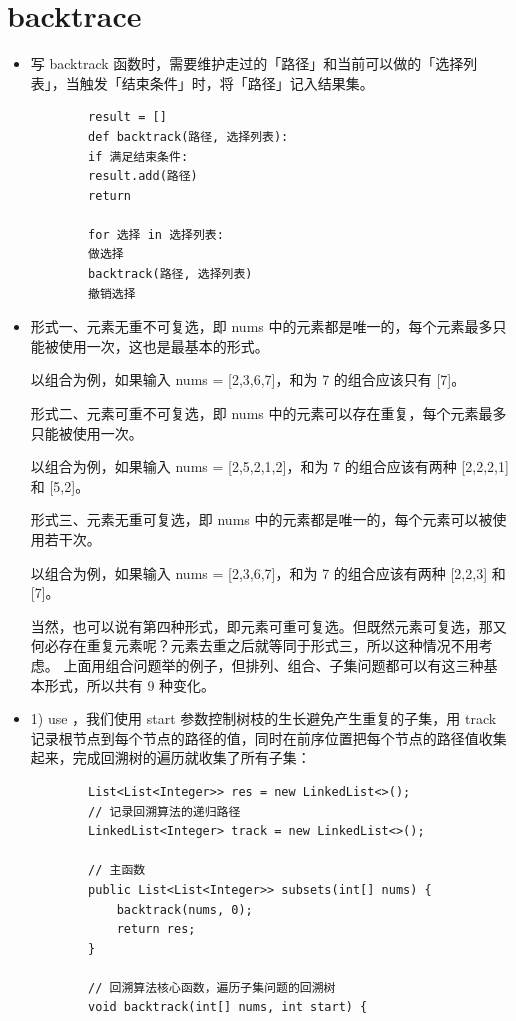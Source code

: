 \documentclass[a4paper,11pt,twoside]{book}
\begin{document}
\section{backtrace}
\begin{itemize}
	
		\item 写 backtrack 函数时，需要维护走过的「路径」和当前可以做的「选择列表」，当触发「结束条件」时，将「路径」记入结果集。
	
	
	\begin{lstlisting}
		result = []
		def backtrack(路径, 选择列表):
		if 满足结束条件:
		result.add(路径)
		return
		
		for 选择 in 选择列表:
		做选择
		backtrack(路径, 选择列表)
		撤销选择
	\end{lstlisting}
	
	
	\item 形式一、元素无重不可复选，即 nums 中的元素都是唯一的，每个元素最多只能被使用一次，这也是最基本的形式。
	
	以组合为例，如果输入 nums = [2,3,6,7]，和为 7 的组合应该只有 [7]。
	
	形式二、元素可重不可复选，即 nums 中的元素可以存在重复，每个元素最多只能被使用一次。
	
	以组合为例，如果输入 nums = [2,5,2,1,2]，和为 7 的组合应该有两种 [2,2,2,1] 和 [5,2]。
	
	形式三、元素无重可复选，即 nums 中的元素都是唯一的，每个元素可以被使用若干次。
	
	以组合为例，如果输入 nums = [2,3,6,7]，和为 7 的组合应该有两种 [2,2,3] 和 [7]。
	
	当然，也可以说有第四种形式，即元素可重可复选。但既然元素可复选，那又何必存在重复元素呢？元素去重之后就等同于形式三，所以这种情况不用考虑。
	上面用组合问题举的例子，但排列、组合、子集问题都可以有这三种基本形式，所以共有 9 种变化。
	
	\item 1) use ，我们使用 start 参数控制树枝的生长避免产生重复的子集，用 track 记录根节点到每个节点的路径的值，同时在前序位置把每个节点的路径值收集起来，完成回溯树的遍历就收集了所有子集：
	
	\begin{lstlisting}
		List<List<Integer>> res = new LinkedList<>();
		// 记录回溯算法的递归路径
		LinkedList<Integer> track = new LinkedList<>();
		
		// 主函数
		public List<List<Integer>> subsets(int[] nums) {
			backtrack(nums, 0);
			return res;
		}
		
		// 回溯算法核心函数，遍历子集问题的回溯树
		void backtrack(int[] nums, int start) {
			

\end{lstlisting}
\end{itemize}
\end{document}
